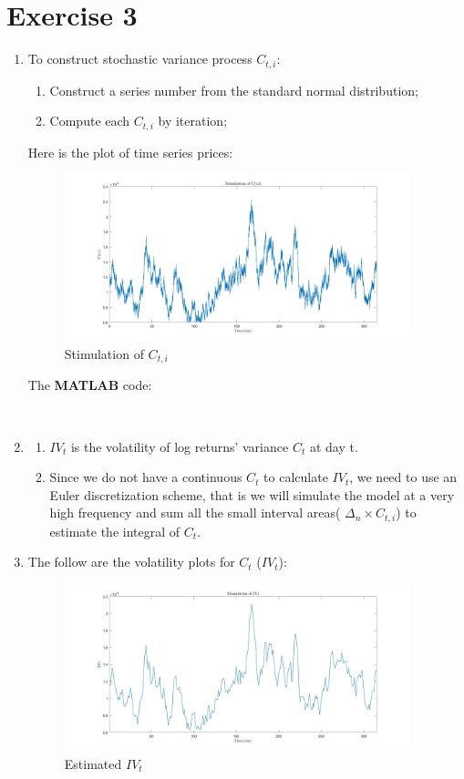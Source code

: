 \documentclass[12pt,letterpaper]{article}
\begin{document}
\section*{Exercise 3}
  \begin{enumerate}[label=\textbf{(\Alph*)}]
 \item  To construct stochastic variance process  $C_{t,i}$:
  \begin{enumerate}[label=(\roman*)]
  	\item Construct a series number from the standard normal distribution;
  	\item Compute each  $C_{t,i}$ by iteration;
  \end{enumerate}
 
Here is the plot of time series prices:
        \begin{figure}[H]
            \centering
            \includegraphics[width=10cm]{figures/p3_ex3_a.jpg}
            \caption{Stimulation of $C_{t,i}$}
        \end{figure}
The \textbf{MATLAB} code:
   
   ~~\\ 
	      
\item  
\begin{enumerate}[label=(\roman*)]
    \item $IV_t$ is the volatility of log returns' variance $C_t$ at day t.
    \item Since we do not have a continuous ${C_t}$ to calculate $IV_t$, we need to use an Euler discretization scheme, that is we will simulate the model at a very high frequency and sum all the small interval areas( $\Delta_n \times C_{t,i}$) to estimate the integral of $C_t$.
\end{enumerate}

\item The follow are the volatility plots for $C_t$ ($IV_t$):
\begin{figure}[H]
            \centering
            \includegraphics[width=10cm]{figures/p3_ex3_c.jpg}
            \caption{Estimated $IV_t$}
           

\end{figure}
\end{enumerate}
\end{document}
